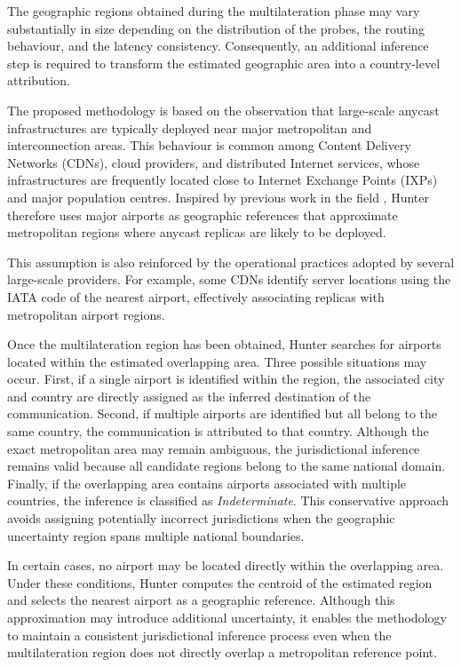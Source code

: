 \documentclass[
A4paper,                %
twoside,                %
openright,              %
chapterprefix=true,     %
12pt,                   %
headings=normal,        %
titlepage=on            %
]{book}
\begin{document}
The geographic regions obtained during the multilateration phase may vary substantially in size depending on the distribution of the probes, the routing behaviour, and the latency consistency. Consequently, an additional inference step is required to transform the estimated geographic area into a country-level attribution.

The proposed methodology is based on the observation that large-scale anycast infrastructures are typically deployed near major metropolitan and interconnection areas. This behaviour is common among Content Delivery Networks (CDNs), cloud providers, and distributed Internet services, whose infrastructures are frequently located close to Internet Exchange Points (IXPs) and major population centres. Inspired by previous work in the field \cite{Cicalese2016Latency-BasedSets}, Hunter therefore uses major airports as geographic references that approximate metropolitan regions where anycast replicas are likely to be deployed.

This assumption is also reinforced by the operational practices adopted by several large-scale providers. For example, some CDNs identify server locations using the IATA code of the nearest airport, effectively associating replicas with metropolitan airport regions.

Once the multilateration region has been obtained, Hunter searches for airports located within the estimated overlapping area. Three possible situations may occur. First, if a single airport is identified within the region, the associated city and country are directly assigned as the inferred destination of the communication. Second, if multiple airports are identified but all belong to the same country, the communication is attributed to that country. Although the exact metropolitan area may remain ambiguous, the jurisdictional inference remains valid because all candidate regions belong to the same national domain. Finally, if the overlapping area contains airports associated with multiple countries, the inference is classified as \textit{Indeterminate}. This conservative approach avoids assigning potentially incorrect jurisdictions when the geographic uncertainty region spans multiple national boundaries.

In certain cases, no airport may be located directly within the overlapping area. Under these conditions, Hunter computes the centroid of the estimated region and selects the nearest airport as a geographic reference. Although this approximation may introduce additional uncertainty, it enables the methodology to maintain a consistent jurisdictional inference process even when the multilateration region does not directly overlap a metropolitan reference point.
\end{document}
